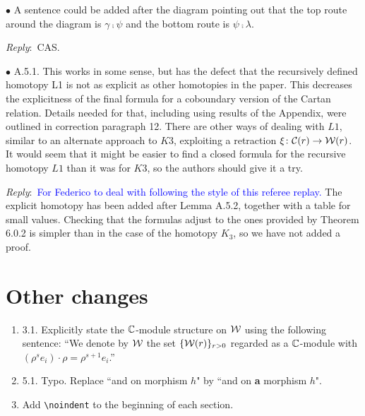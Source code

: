 \documentclass{amsart}
\newcommand{\ar}{\medskip\noindent\textit{Reply}:\ }
\def\subitem{\medskip\noindent$\bullet$ }
\begin{document}
\begin{enumerate}
	\subitem A sentence could be added after the diagram pointing out that the top route
	around the diagram is $\gamma \comp \psi$ and the bottom route is $\psi \comp \lambda$.

	\ar CAS.

	\subitem A.5.1. This works in some sense, but has the defect that the recursively defined homotopy
	L1 is not as explicit as other homotopies in the paper.
	This decreases the explicitness of the final formula for a coboundary version of the Cartan relation.
	Details needed for that, including using results of the Appendix, were outlined in correction paragraph 12.
	There are other ways of dealing with $L1$, similar to an alternate approach to $K3$, exploiting a
	retraction $\xi \colon \mathcal{C}(r) \to \mathcal{W}(r)$.
	It would seem that it might be easier to find a closed formula for the recursive homotopy $L1$ than it was for $K3$, so the authors should give it a try.

	\ar \textcolor{blue}{For Federico to deal with following the style of this referee replay.} The explicit homotopy has been added after Lemma A.5.2, together with a table for small values. Checking that the formulas adjust to the ones provided by Theorem 6.0.2 is simpler than in the case of the homotopy $K_3$, so we have not added a proof.
\end{enumerate}

\section{Other changes}

\begin{enumerate}
	\item 3.1. Explicitly state the $\mathbb{C}$-module structure on $\mathcal{W}$ using the following sentence:
	``We denote by $\mathcal{W}$ the set $\{\mathcal{W}(r)\}_{r > 0}$ regarded as a $\mathbb{C}$-module with $(\rho^s e_i) \cdot \rho = \rho^{s+1} e_i$.''

	\item 5.1. Typo. Replace ``and on morphism $h$" by ``and on \textbf{a} morphism $h$".

	\item Add \verb|\noindent| to the beginning of each section.
\end{enumerate}
\end{document}
